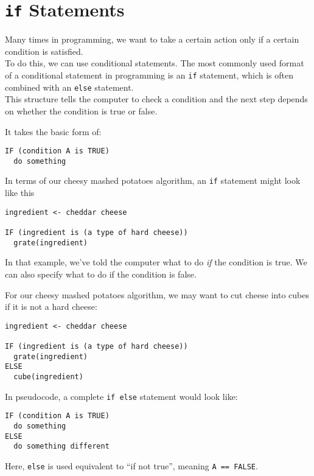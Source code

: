\documentclass[
]{book}
\begin{document}
\section{\texorpdfstring{\texttt{if} Statements}{if Statements}}\label{if-statements}

Many times in programming, we want to take a certain action only if a certain condition is satisfied.\\

To do this, we can use conditional statements. The most commonly used format of a conditional statement in programming is an \texttt{if} statement, which is often combined with an \texttt{else} statement.\\

This structure tells the computer to check a condition and the next step depends on whether the condition is true or false.

It takes the basic form of:

\begin{verbatim}
IF (condition A is TRUE)
  do something
\end{verbatim}

In terms of our cheesy mashed potatoes algorithm, an \texttt{if} statement might look like this

\begin{verbatim}
ingredient <- cheddar cheese

IF (ingredient is (a type of hard cheese))
  grate(ingredient)
\end{verbatim}

In that example, we've told the computer what to do \emph{if} the condition is true. We can also specify what to do if the condition is false.

For our cheesy mashed potatoes algorithm, we may want to cut cheese into cubes if it is not a hard cheese:

\begin{verbatim}
ingredient <- cheddar cheese

IF (ingredient is (a type of hard cheese))
  grate(ingredient)
ELSE
  cube(ingredient)
\end{verbatim}

In pseudocode, a complete \texttt{if\ else} statement would look like:

\begin{verbatim}
IF (condition A is TRUE)
  do something
ELSE 
  do something different
\end{verbatim}

Here, \texttt{else} is used equivalent to ``if not true'', meaning \texttt{A\ ==\ FALSE}.\\
\end{document}
